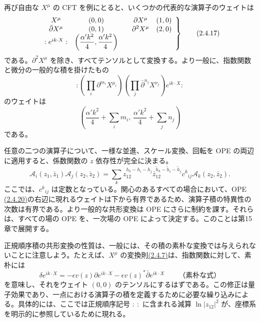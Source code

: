 再び自由な $X^\mu$ の CFT を例にとると、いくつかの代表的な演算子のウェイトは
\begin{equation}
\left.
\begin{array}{c@{\quad}c@{\qquad}c@{\quad}c}
X^\mu&(0,0)&\partial X^\mu&(1,0)\\
\bar\partial X^\mu&(0,1)&\partial^2X^\mu&(2,0)\\
:e^{ik\cdot X}:&
\displaystyle\left(\frac{\alpha'k^2}4,\frac{\alpha'k^2}4\right)&&
\end{array}
\right\}
\tag{2.4.17}\label{eq:2.4.17}
\end{equation}
である。$\partial^2X^\mu$ を除き、すべてテンソルとして変換する。より一般に、指数関数と微分の一般的な積を掛けたもの
\begin{equation}
:\left(\prod_i\partial^{m_i}X^{\mu_i}\right)
\left(\prod_j\bar\partial^{n_j}X^{\nu_j}\right)e^{ik\cdot X}:
\tag{2.4.18}\label{eq:2.4.18}
\end{equation}
のウェイトは
\begin{equation}
\left(\frac{\alpha'k^2}4+\sum_i m_i,\,
\frac{\alpha'k^2}4+\sum_j n_j\right)
\tag{2.4.19}\label{eq:2.4.19}
\end{equation}
である。

任意の二つの演算子について、一様な並進、スケール変換、回転を OPE の両辺に適用すると、係数関数の $z$ 依存性が完全に決まる。
\begin{equation}
\mathcal A_i(z_1,\bar z_1)\mathcal A_j(z_2,\bar z_2)
=\sum_k z_{12}^{h_k-h_i-h_j}
\bar z_{12}^{\tilde h_k-\tilde h_i-\tilde h_j}
c^k{}_{ij}\mathcal A_k(z_2,\bar z_2).
\tag{2.4.20}\label{eq:2.4.20}
\end{equation}
ここでは、$c^k{}_{ij}$ は定数となっている。関心のあるすべての場合において、OPE \hyperref[eq:2.4.20]{(2.4.20)}の右辺に現れるウェイトは下から有界であるため、演算子積の特異性の次数は有界である。より一般的な共形変換は OPE にさらに制約を課す。それらは、すべての場の OPE を、一次場の OPE によって決定する。このことは第15章で展開する。

正規順序積の共形変換の性質は、一般には、その積の素朴な変換では与えられないことに注意しよう。たとえば、$X^\mu$ の変換則\hyperref[eq:2.4.7]{(2.4.7)}は、指数関数に対して、素朴には
\begin{equation}
\delta e^{ik\cdot X}
=-\epsilon v(z)\partial e^{ik\cdot X}
-\epsilon v(z)^*\bar\partial e^{ik\cdot X}
\qquad\text{（素朴な式）}
\tag{2.4.21}\label{eq:2.4.21}
\end{equation}
を意味し、それをウェイト $(0,0)$ のテンソルにするはずである。この修正は量子効果であり、一点における演算子の積を定義するために必要な繰り込みによる。具体的には、ここでは正規順序記号 $:\ :$ に含まれる減算 $\ln|z_{12}|^2$ が、座標系を明示的に参照しているために現れる。

